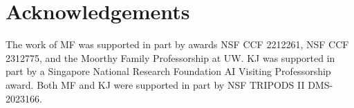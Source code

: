 \section*{Acknowledgements}
The work of MF was supported in part by awards NSF CCF 2212261, NSF CCF 2312775, and the Moorthy Family Professorship at UW. KJ was supported in part by a Singapore National Research Foundation AI Visiting Professorship award. Both MF and KJ were supported in part by NSF TRIPODS II DMS-2023166.